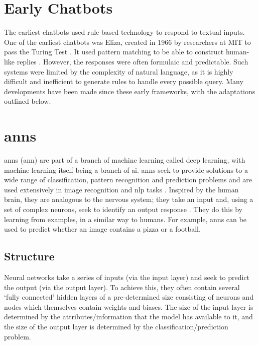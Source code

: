 \section{Early Chatbots}\label{sec:background_early_chatbots}
The earliest chatbots used rule-based technology to respond to textual inputs. One of the earliest chatbots was Eliza, created in 1966 by researchers at MIT to pass the Turing Test \citep{zemvcik2019}. It used pattern matching to be able to construct human-like replies \citep{Luka}. However, the responses were often formulaic and predictable. Such systems were limited by the complexity of natural language, as it is highly difficult and inefficient to generate rules to handle every possible query. Many developments have been made since these early frameworks, with the adaptations outlined below.


\section{\acrlong{ann}s}\label{sec:background_anns}
\acrlong{ann}s (\acrshort{ann}) are part of a branch of machine learning called deep learning, with machine learning itself being a branch of \acrlong{ai}. \acrshort{ann}s seek to provide solutions to a wide range of classification, pattern recognition and prediction problems and are used extensively in image recognition and \acrfull{nlp} tasks \citep{Abiodun}. Inspired by the human brain, they are analogous to the nervous system; they take an input and, using a set of complex neurons, seek to identify an output response \citep{Bishop}. They do this by learning from examples, in a similar way to humans. For example, \acrshort{ann}s can be used to predict whether an image contains a pizza or a football.

\subsection{Structure}\label{sec:background_anns_structure}
Neural networks take a series of inputs (via the input layer) and seek to predict the output (via the output layer). To achieve this, they often contain several `fully connected' hidden layers of a pre-determined size consisting of neurons and nodes which themselves contain weights and biases. The size of the input layer is determined by the attributes/information that the model has available to it, and the size of the output layer is determined by the classification/prediction problem. 

